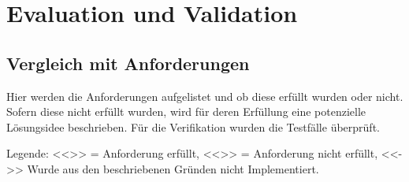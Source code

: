 \chapter{Evaluation und Validation}
\label{ch:Eval}

\section{Vergleich mit Anforderungen}
\label{sec:VergleichAnforderungen}
Hier werden die Anforderungen aufgelistet und ob diese erfüllt wurden oder nicht. Sofern diese nicht erfüllt wurden, wird für deren Erfüllung eine potenzielle Lösungsidee beschrieben. Für die Verifikation wurden die Testfälle überprüft.

Legende:
<<\checkmark >> = Anforderung erfüllt, <<\xmark>> = Anforderung nicht erfüllt, <<->> Wurde aus den beschriebenen Gründen nicht Implementiert.


